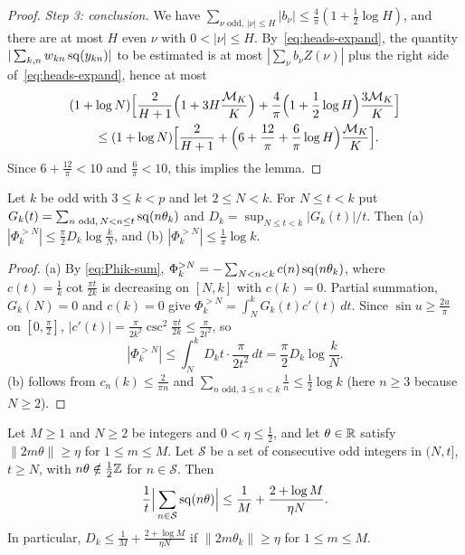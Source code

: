 \begin{proof}
\emph{Step 3: conclusion.} We have $\sum_{\nu\text{ odd},\,|\nu|\le H}|b_\nu|\le\frac4\pi(1+\frac12\log H)$, and there are at most $H$ even $\nu$ with $0<|\nu|\le H$. By~\eqref{eq:heads-expand}, the quantity $|\sum_{k,n}w_{kn}\operatorname{sq}(y_{kn})|$ to be estimated is at most $|\sum_\nu b_\nu Z(\nu)|$ plus the right side of~\eqref{eq:heads-expand}, hence at most
\begin{align*}
&(1+\log N)\Bigl[\frac2{H+1}\Bigl(1+3H\frac{\mathcal{M}_K}K\Bigr)+\frac4\pi\Bigl(1+\frac12\log H\Bigr)\frac{3\mathcal{M}_K}K\Bigr]\\
&\qquad\le(1+\log N)\Bigl[\frac2{H+1}+\Bigl(6+\frac{12}\pi+\frac6\pi\log H\Bigr)\frac{\mathcal{M}_K}{K}\Bigr].
\end{align*}
Since $6+\frac{12}\pi<10$ and $\frac6\pi<10$, this implies the lemma.
\end{proof}

\begin{lemma}[Tails]\label{lem:tails}
Let $k$ be odd with $3\le k<p$ and let $2\le N<k$. For $N\le t<k$ put $G_k(t)=\sum_{n\text{ odd},\,N<n\le t}\operatorname{sq}(n\theta_k)$
and $D_k=\sup_{N\le t<k}|G_k(t)|/t$. Then \textup{(a)} $|\Phi_k^{>N}|\le\frac\pi2D_k\log\frac kN$, and
\textup{(b)} $|\Phi_k^{>N}|\le\frac1\pi\log k$.
\end{lemma}

\begin{proof}
(a) By \eqref{eq:Phik-sum}, $\Phi_k^{>N}=-\sum_{N<n<k}c(n)\operatorname{sq}(n\theta_k)$, where $c(t)=\frac1k\cot\frac{\pi t}{2k}$ is
decreasing on $[N,k]$ with $c(k)=0$. Partial summation, $G_k(N)=0$ and $c(k)=0$ give
$\Phi_k^{>N}=\int_N^kG_k(t)c'(t)\,dt$. Since $\sin u\ge\frac{2u}\pi$ on $[0,\frac\pi2]$,
$|c'(t)|=\frac\pi{2k^2}\csc^2\frac{\pi t}{2k}\le\frac\pi{2t^2}$, so
\[
|\Phi_k^{>N}|\le\int_N^kD_kt\cdot\frac\pi{2t^2}\,dt=\frac\pi2D_k\log\frac kN.
\]
(b) follows from $c_n(k)\le\frac2{\pi n}$ and $\sum_{n\text{ odd},\,3\le n<k}\frac1n\le\frac12\log k$ (here $n\ge3$ because $N\ge2$).
\end{proof}

\begin{lemma}\label{lem:generic}
Let $M\ge1$ and $N\ge2$ be integers and $0<\eta\le\frac12$, and let $\theta\in\mathbb{R}$ satisfy $\|2m\theta\|\ge\eta$ for
$1\le m\le M$. Let $\mathcal{S}$ be a set of consecutive odd integers in $(N,t]$, $t\ge N$, with
$n\theta\notin\frac12\mathbb{Z}$ for $n\in\mathcal{S}$. Then
\[
\frac1t\Big|\sum_{n\in\mathcal{S}}\operatorname{sq}(n\theta)\Big|\le\frac1M+\frac{2+\log M}{\eta N}.
\]
In particular, $D_k\le\frac1M+\frac{2+\log M}{\eta N}$ if $\|2m\theta_k\|\ge\eta$ for $1\le m\le M$.
\end{lemma}

